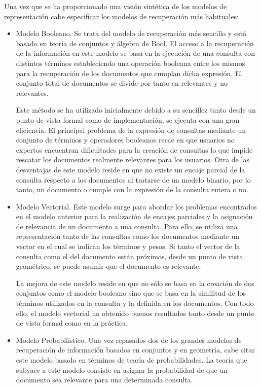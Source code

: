 Una vez que se ha proporcionado una visión sintética de los modelos 
de representación cabe especificar los modelos de recuperación más 
habituales:

\begin{itemize}
 \item Modelo Booleano. Se trata del modelo de recuperación más sencillo y está basado 
en teoría de conjuntos y álgebra de Bool. El acceso a la recuperación de la información 
en este modelo se basa en la ejecución de una consulta con distintos términos estableciendo 
una operación booleana entre los mismos para la recuperación de los documentos que cumplan 
dicha expresión. El conjunto total de documentos se divide por tanto en relevantes y 
no relevantes. 

Este método se ha utilizado inicialmente debido a su sencillez tanto desde un punto 
de vista formal como de implementación, se ejecuta con una gran eficiencia. El principal 
problema de la expresión de consultas mediante un conjunto de términos y operadores booleanos 
recae en que usuarios no expertos encuentran dificultades para la creación de consultas 
lo que impide rescatar los documentos realmente relevantes para los usuarios. Otra 
de las desventajas de este modelo reside en que no existe un encaje parcial de la consulta 
respecto a los documentos al tratarse de un modelo binario, por lo tanto, un documento 
o cumple con la expresión de la consulta entera o no.
 
\item Modelo Vectorial. Este modelo surge para abordar los problemas encontrados en el modelo 
anterior para la realización de encajes parciales y la asignación de relevancia de un documento 
a una consulta. Para ello, se utiliza una representación tanto de las consultas como los 
documentos mediante un vector en el cual se indican los términos y pesos. Si tanto 
el vector de la consulta como el del documento están próximos, desde un punto de 
vista geométrico, se puede asumir que el documento es relevante.

La mejora de este modelo reside en que no sólo se basa en la creación de dos conjuntos 
como el modelo booleano sino que se basa en la similitud de los términos utilizados 
en la consulta y la definida en los documentos. Con todo ello, el modelo vectorial 
ha obtenido buenos resultados tanto desde un punto de vista formal como en la práctica.
 
\item Modelo Probabilístico. Una vez repasados dos de los grandes modelos de recuperación 
de información basados en conjuntos y en geometría, cabe citar este modelo basado en términos 
de teoría de probabilidades. La teoría que subyace a este modelo consiste en asignar la probabilidad 
de que un documento sea relevante para una determinada consulta.
\end{itemize}


